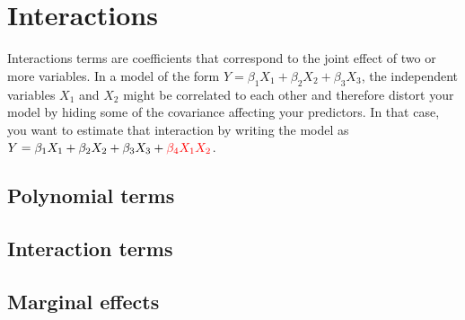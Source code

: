%
%
%
\section{Interactions}%
  \label{sec:interactions}%

	Interactions terms are coefficients that correspond to the joint effect of two or more variables. In a model of the form $Y = \beta_1 X_1 + \beta_2 X_2 + \beta_3 X_3$, the independent variables $X_1$ and $X_2$ might be correlated to each other and therefore distort your model by hiding some of the covariance affecting your predictors. In that case, you want to estimate that interaction by writing the model as $Y = \beta_1 X_1 + \beta_2 X_2 + \beta_3 X_3 +  {\color{red}\beta_4 X_1X_2}$.%

	\subsection{Polynomial terms}

	\subsection{Interaction terms}

	\subsection{Marginal effects}%

